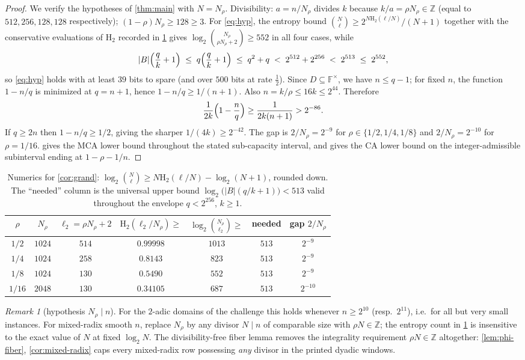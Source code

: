 \documentclass[11pt]{article}
\theoremstyle{definition}
\theoremstyle{remark}
\newtheorem{remark}[theorem]{Remark}
\newcommand{\F}{\mathbb{F}}
\newcommand{\B}{B}
\newcommand{\Hb}{\mathrm{H}_2}
\begin{document}
\begin{proof}
We verify the hypotheses of \cref{thm:main} with $N=N_\rho$. Divisibility: $a=n/N_\rho$ divides $k$ because $k/a=\rho N_\rho\in\mathbb Z$ (equal to $512,256,128,128$ respectively); $(1-\rho)N_\rho\ge128\ge3$. For \eqref{eq:hyp}, the entropy bound $\binom N\ell\ge2^{N\Hb(\ell/N)}/(N+1)$ together with the conservative evaluations of $\Hb$ recorded in \cref{tab:numerics} gives $\log_2\binom{N_\rho}{\rho N_\rho+2}\ge552$ in all four cases, while
\[
|\B|\Bigl(\frac qk+1\Bigr)\;\le\;q\Bigl(\frac qk+1\Bigr)\;\le\;q^2+q\;<\;2^{512}+2^{256}\;<\;2^{513}\;\le\;2^{552},
\]
so \eqref{eq:hyp} holds with at least $39$ bits to spare (and over $500$ bits at rate $\frac12$). Since $D\subseteq\F^\times$, we have $n\le q-1$; for fixed $n$, the function $1-n/q$ is minimized at $q=n+1$, hence $1-n/q\ge1/(n+1)$. Also $n=k/\rho\le16k\le2^{44}$. Therefore
\[
\frac1{2k}\Bigl(1-\frac nq\Bigr)\ge\frac1{2k(n+1)}>2^{-86}.
\]
If $q\ge2n$ then $1-n/q\ge1/2$, giving the sharper $1/(4k)\ge2^{-42}$. The gap is $2/N_\rho=2^{-9}$ for $\rho\in\{1/2,1/4,1/8\}$ and $2/N_\rho=2^{-10}$ for $\rho=1/16$.  gives the MCA lower bound throughout the stated sub-capacity interval, and gives the CA lower bound on the integer-admissible subinterval ending at $1-\rho-1/n$.
\end{proof}

\begin{table}[ht]
\centering
\begin{tabular}{ccccccc}
\toprule
$\rho$ & $N_\rho$ & $\ell_2=\rho N_\rho+2$ & $\Hb(\ell_2/N_\rho)\ge$ & $\log_2\binom{N_\rho}{\ell_2}\ge$ & needed & gap $2/N_\rho$\\
\midrule
$1/2$  & $1024$ & $514$ & $0.99998$ & $1013$ & $513$ & $2^{-9}$\\
$1/4$  & $1024$ & $258$ & $0.8143$  & $823$  & $513$ & $2^{-9}$\\
$1/8$  & $1024$ & $130$ & $0.5490$  & $552$  & $513$ & $2^{-9}$\\
$1/16$ & $2048$ & $130$ & $0.34105$ & $687$  & $513$ & $2^{-10}$\\
\bottomrule
\end{tabular}
\caption{Numerics for \cref{cor:grand}: $\log_2\binom{N}{\ell}\ge N\Hb(\ell/N)-\log_2(N+1)$, rounded down. The ``needed'' column is the universal upper bound $\log_2\bigl(|\B|(q/k+1)\bigr)<513$ valid throughout the envelope $q<2^{256}$, $k\ge1$.}
\label{tab:numerics}
\end{table}

\begin{remark}[hypothesis $N_\rho\mid n$]
For the $2$-adic domains of the challenge this holds whenever $n\ge2^{10}$ (resp.\ $2^{11}$), i.e.\ for all but very small instances. For mixed-radix smooth $n$, replace $N_\rho$ by any divisor $N\mid n$ of comparable size with $\rho N\in\mathbb Z$; the entropy count in \cref{tab:numerics} is insensitive to the exact value of $N$ at fixed $\log_2 N$. The divisibility-free fiber lemma removes the integrality requirement $\rho N\in\mathbb Z$ altogether: \cref{lem:phi-fiber}, \cref{cor:mixed-radix} caps every mixed-radix row possessing \emph{any} divisor in the printed dyadic windows.
\end{remark}
\end{document}
